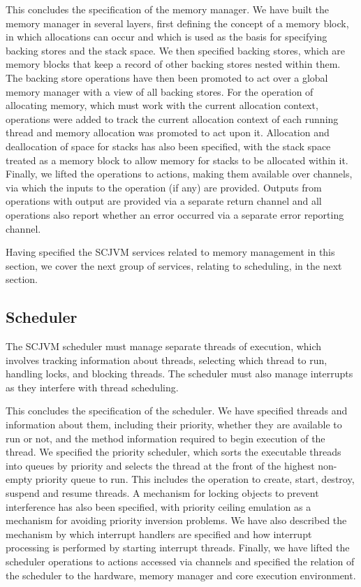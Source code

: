 

This concludes the specification of the memory manager.
We have built the memory manager in several layers, first defining the
concept of a memory block, in which allocations can occur and which is
used as the basis for specifying backing stores and the stack space.
We then specified backing stores, which are memory blocks that keep a
record of other backing stores nested within them.
The backing store operations have then been promoted to act over a
global memory manager with a view of all backing stores.
For the operation of allocating memory, which must work with the
current allocation context, operations were added to track the current
allocation context of each running thread and memory allocation was
promoted to act upon it.
Allocation and deallocation of space for stacks has also been
specified, with the stack space treated as a memory block to allow
memory for stacks to be allocated within it.
Finally, we lifted the operations to \Circus{} actions, making them
available over channels, via which the inputs to the operation (if
any) are provided.
Outputs from operations with output are provided via a separate return
channel and all operations also report whether an error occurred via a
separate error reporting channel.

Having specified the SCJVM services related to memory management in
this section, we cover the next group of services, relating to
scheduling, in the next section.

\subsection{Scheduler}
\label{scheduler-model-section}

The SCJVM scheduler must manage separate threads of execution, which
involves tracking information about threads, selecting which thread to
run, handling locks, and blocking threads.
The scheduler must also manage interrupts as they interfere with
thread scheduling.



This concludes the specification of the scheduler.
We have specified threads and information about them, including their
priority, whether they are available to run or not, and the method
information required to begin execution of the thread.
We specified the priority scheduler, which sorts the executable
threads into queues by priority and selects the thread at the front of
the highest non-empty priority queue to run.
This includes the operation to create, start, destroy, suspend and
resume threads.
A mechanism for locking objects to prevent interference has also been
specified, with priority ceiling emulation as a mechanism for avoiding
priority inversion problems.
We have also described the mechanism by which interrupt handlers are
specified and how interrupt processing is performed by starting
interrupt threads.
Finally, we have lifted the scheduler operations to \Circus{} actions
accessed via channels and specified the relation of the scheduler to
the hardware, memory manager and core execution environment.

